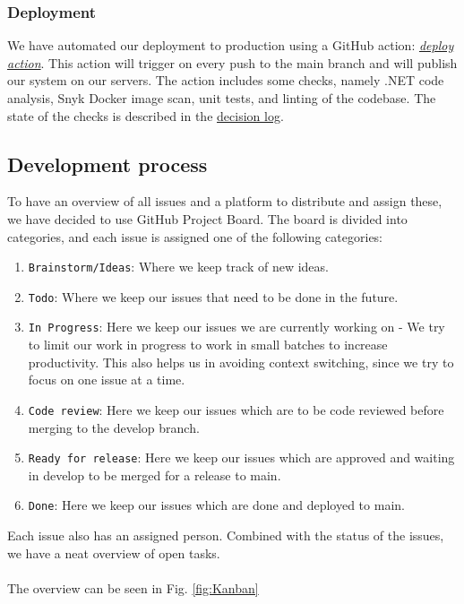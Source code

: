 \documentclass[10pt]{article}
\begin{document}
\subsubsection{Deployment}
We have automated our deployment to production using a GitHub action: 
\href{https://github.com/Arklaide/devopsITUproject/blob/main/.github/workflows/deploy.yaml}{\textit{deploy action}}.
This action will trigger on every push to the main branch and will publish our system on our servers. The action includes some checks, namely .NET code analysis, Snyk Docker image scan, unit tests, and linting of the codebase. The state of the checks is described in the \href{https://github.com/Arklaide/devopsITUproject/blob/main/report/sub-reports/decision_log.md}{decision log}.


\subsection{Development process}
\label{Development_process}
To have an overview of all issues and a platform to distribute and assign these, we have decided to use GitHub Project Board.
The board is divided into categories, and each issue is assigned one of the following categories:
\begin{enumerate}
    \item \texttt{Brainstorm/Ideas}: Where we keep track of new ideas.
    \item \texttt{Todo}: Where we keep our issues that need to be done in the future.
    \item \texttt{In Progress}: Here we keep our issues we are currently working on - We try to limit our work in progress to work in small batches to increase productivity. This also helps us in avoiding context switching, since we try to focus on one issue at a time.
    \item \texttt{Code review}: Here we keep our issues which are to be code reviewed before merging to the develop branch.
    \item \texttt{Ready for release}: Here we keep our issues which are approved and waiting in develop to be merged for a release to main.
    \item \texttt{Done}: Here we keep our issues which are done and deployed to main.
\end{enumerate}
Each issue also has an assigned person. Combined with the status of the issues, we have a neat overview of open tasks.
\\
\\
The overview can be seen in Fig. \ref{fig:Kanban}
\end{document}

